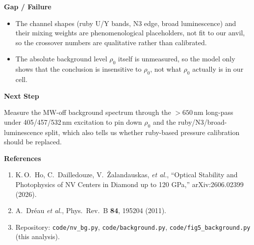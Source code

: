\documentclass[11pt,a4paper]{ltjsarticle}
\newcommand{\sectionblock}[1]{%
  \vspace{2mm}
  {\large\textbf{#1}}
  \vspace{1mm}

}
\begin{document}
\sectionblock{Gap / Failure}

\begin{itemize}[leftmargin=8mm]
  \item The channel shapes (ruby U/Y bands, N3 edge, broad luminescence) and their mixing weights are phenomenological placeholders, not fit to our anvil, so the crossover numbers are qualitative rather than calibrated.
  \item The absolute background level $\rho_0$ itself is unmeasured, so the model only shows that the conclusion is insensitive to $\rho_0$, not what $\rho_0$ actually is in our cell.
\end{itemize}

\sectionblock{Next Step}

Measure the MW-off background spectrum through the $>650$\,nm long-pass under 405/457/532\,nm excitation to pin down $\rho_0$ and the ruby/N3/broad-luminescence split, which also tells us whether ruby-based pressure calibration should be replaced.

\sectionblock{References}

\begin{enumerate}[leftmargin=8mm]
  \item K.\,O.\ Ho, C.\ Dailledouze, V.\ \v{Z}alandauskas, \emph{et al.}, ``Optical Stability and Photophysics of NV Centers in Diamond up to 120 GPa,'' arXiv:2606.02399 (2026).
  \item A.\ Dr\'eau \emph{et al.}, Phys.\ Rev.\ B \textbf{84}, 195204 (2011).
  \item Repository: \texttt{code/nv\_bg.py}, \texttt{code/background.py}, \texttt{code/fig5\_background.py} (this analysis).
\end{enumerate}
\end{document}
